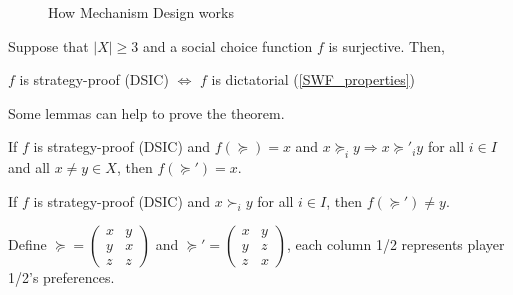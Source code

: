 \documentclass[11pt]{elegantbook}
\begin{document}
\begin{center}\begin{figure}[htbp]
    \centering
    \caption{How Mechanism Design works}
    \label{}
\end{figure}\end{center}

\begin{theorem}
    Suppose that $|X|\geq 3$ and a social choice function $f$ is surjective. Then,
    \begin{center}
        $f$ is strategy-proof (DSIC) $\Leftrightarrow$ $f$ is dictatorial (\ref{SWF_properties})
    \end{center}
\end{theorem}
Some lemmas can help to prove the theorem.
\begin{lemma}
    If $f$ is strategy-proof (DSIC) and $f(\succeq)=x$ and $x\succeq_i y \Rightarrow x\succeq'_i y$ for all $i\in I$ and all $x\neq y\in X$, then $f(\succeq')=x$.
\end{lemma}

\begin{lemma}
    If $f$ is strategy-proof (DSIC) and $x\succ_i y$ for all $i\in I$, then $f(\succeq')\neq y$.
\end{lemma}

\begin{example}
    Define $\succeq=\begin{pmatrix}
        x&y\\
        y&x\\
        z&z
    \end{pmatrix}$ and $\succeq'=\begin{pmatrix}
        x&y\\
        y&z\\
        z&x
    \end{pmatrix}$, each column 1/2 represents player 1/2's preferences.
\end{example}
\end{document}
